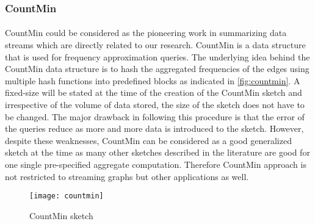 \subsubsection{CountMin\cite{cormode_improved_2003}}

\paragraph{}
CountMin could be considered as the pioneering work in summarizing data streams which are directly related to our research. CountMin is a data structure that is used for frequency approximation queries. The underlying idea behind the CountMin data structure is to hash the aggregated frequencies of the edges using multiple hash functions into predefined blocks as indicated in \autoref{fig:countmin}. A fixed-size will be stated at the time of the creation of the CountMin sketch and irrespective of the volume of data stored, the size of the sketch does not have to be changed. The major drawback in following this procedure is that the error of the queries reduce as more and more data is introduced to the sketch. However, despite these weaknesses, CountMin can be considered as a good generalized sketch at the time as many other sketches described in the literature are good for one single pre-specified aggregate computation. Therefore CountMin approach is not restricted to streaming graphs but other applications as well\cite{cormode_improved_2003}.

\begin{figure}[H]
    \centering \texttt{[image: countmin]}
    \caption{CountMin sketch}
    \label{fig:countmin}
\end{figure}